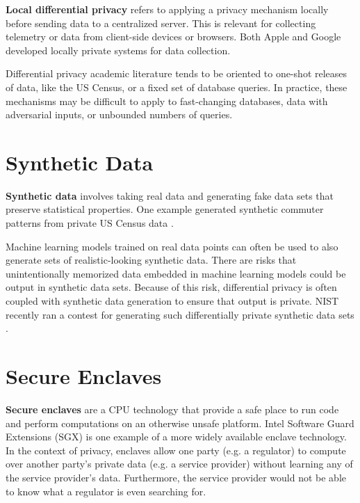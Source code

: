 \documentclass[nobib]{tufte-handout}
\begin{document}
\textbf{Local differential privacy} refers to applying a privacy mechanism
locally before sending data to a centralized server. This is relevant for
collecting telemetry or data from client-side devices or browsers. Both Apple
\cite{apple-local-differential-privacy} and Google \cite{erlingsson2014rappor}
developed locally private systems for data collection.

Differential privacy academic literature tends to be oriented to one-shot
releases of data, like the US Census, or a fixed set of database queries. In
practice, these mechanisms may be difficult to apply to fast-changing databases,
data with adversarial inputs, or unbounded numbers of queries.

\section{Synthetic Data}

\textbf{Synthetic data} involves taking real data and generating fake data sets
that preserve statistical properties. One example generated synthetic commuter
patterns from private US Census data \cite{DBLP:conf/icde/MachanavajjhalaKAGV08}.

Machine learning models trained on real
data points can often be used to also generate sets of realistic-looking
synthetic data. There are risks that unintentionally memorized data
\cite{DBLP:journals/corr/abs-1802-08232} embedded in machine learning models
could be output in synthetic data sets. Because of this risk, differential
privacy is often coupled with synthetic data generation to ensure that output is
private. NIST recently ran a contest for generating such differentially private
synthetic data sets \cite{nist-synthetic-data}.

\section{Secure Enclaves}

\textbf{Secure enclaves} are a CPU technology that provide a safe place to run
code and perform computations on an otherwise unsafe platform. Intel Software
Guard Extensions (SGX) \cite{intel-sgx} is one example of a more widely
available enclave technology. In the context of privacy, enclaves allow one
party (e.g. a regulator) to compute over another party’s private data (e.g. a
service provider) without learning any of the service provider’s data.
Furthermore, the service provider would not be able to know what a regulator is
even searching for.
\end{document}
